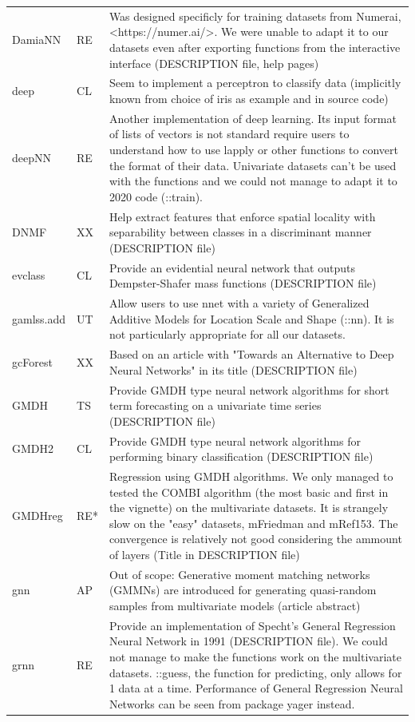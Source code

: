 \begin{Schunk}
\begin{longtable}[t]{ll>{\raggedright\arraybackslash}p{10cm}}
DamiaNN & RE & Was designed specificly for training datasets from Numerai, <https://numer.ai/>. We were unable to adapt it to our datasets even after exporting functions from the interactive interface (DESCRIPTION file, help pages)\\
deep & CL & Seem to implement a perceptron to classify data (implicitly known from choice of iris as example and in source code)\\
deepNN & RE & Another implementation of deep learning. Its input format of lists of vectors is not standard require users to understand how to use lapply or other functions to convert the format of their data. Univariate datasets can't be used with the functions and we could not manage to adapt it to 2020 code (::train).\\
\addlinespace
DNMF & XX & Help extract features that enforce spatial locality with separability between classes in a discriminant manner (DESCRIPTION file)\\
evclass & CL & Provide an evidential neural network that outputs Dempster-Shafer mass functions (DESCRIPTION file)\\
gamlss.add & UT & Allow users to use nnet with a variety of Generalized Additive Models for Location Scale and Shape (::nn). It is not particularly appropriate for all our datasets.\\
gcForest & XX & Based on an article with "Towards an Alternative to Deep Neural Networks" in its title (DESCRIPTION file)\\
GMDH & TS & Provide GMDH type neural network algorithms for short term forecasting on a univariate time series (DESCRIPTION file)\\
\addlinespace
GMDH2 & CL & Provide GMDH type neural network algorithms for performing binary classification (DESCRIPTION file)\\
GMDHreg & RE* & Regression using GMDH algorithms. We only managed to tested the COMBI algorithm (the most basic and first in the vignette) on the multivariate datasets. It is strangely slow on the "easy" datasets, mFriedman and mRef153. The convergence is relatively not good considering the ammount of layers (Title in DESCRIPTION file)\\
gnn & AP & Out of scope: Generative moment matching networks (GMMNs) are introduced for generating quasi-random samples from multivariate models (article abstract)\\
grnn & RE & Provide an implementation of Specht's General Regression Neural Network in 1991 (DESCRIPTION file). We could not manage to make the functions work on the multivariate datasets. ::guess, the function for predicting, only allows for 1 data at a time. Performance of General Regression Neural Networks can be seen from package yager instead.\\

\end{longtable}
\end{Schunk}
